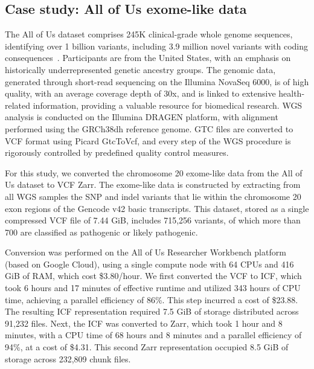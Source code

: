 \documentclass[a4paper,num-refs]{oup-contemporary}
\begin{document}
\subsection{Case study: All of Us exome-like data}
The All of Us dataset comprises 245K clinical-grade whole genome sequences,
identifying over 1 billion variants, including 3.9 million novel variants
with coding consequences~\citep{all2024genomic}. Participants are from the United States,
with an emphasis on historically underrepresented genetic ancestry groups.
The genomic data, generated through short-read sequencing on the Illumina NovaSeq 6000,
is of high quality, with an average coverage depth of 30x, and is linked to extensive
health-related information, providing a valuable resource for biomedical research.
WGS analysis is conducted on the Illumina DRAGEN platform, with alignment performed
using the GRCh38dh reference genome. GTC files are converted to VCF format using
Picard GtcToVcf, and every step of the WGS procedure is rigorously controlled by
predefined quality control measures.

For this study, we converted the chromosome 20 exome-like
data from the All of Us dataset to VCF Zarr.
The exome-like data is constructed by extracting from all WGS samples
the SNP and indel variants that lie within the chromosome 20 exon regions of the Gencode v42 basic
transcripts. This dataset, stored as a single compressed VCF file of 7.44 GiB,
includes 715,256 variants, of which more than 700 are classified as pathogenic or likely pathogenic.

Conversion was performed on the All of Us Researcher Workbench platform
(based on Google Cloud), using a single compute node with 64 CPUs and 416 GiB
of RAM, which cost \$3.80/hour. We first converted the VCF to  ICF, which
took 6 hours and 17 minutes of effective runtime and utilized 343 hours of CPU
time, achieving a parallel efficiency of 86\%. This step incurred a cost of
\$23.88. The resulting ICF representation required 7.5 GiB of storage distributed
across 91,232 files. Next, the ICF was converted to Zarr, which took 1 hour and 8 minutes, with
a CPU time of 68 hours and 8 minutes and a parallel efficiency of 94\%, at a
cost of \$4.31. This second Zarr representation occupied 8.5 GiB of storage across
232,809 chunk files.
\end{document}
